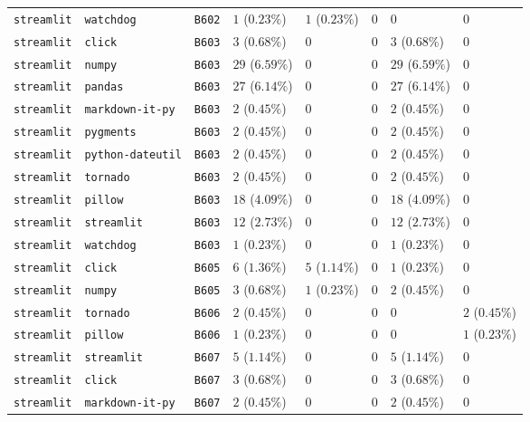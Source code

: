 \begin{table}
\begin{tabular}{llllllll}
\texttt{streamlit} & \texttt{watchdog} & \texttt{B602} & $1$ ($0.23\%$) & $1$ ($0.23\%$) & $0$ & $0$ & $0$ \\
\texttt{streamlit} & \texttt{click} & \texttt{B603} & $3$ ($0.68\%$) & $0$ & $0$ & $3$ ($0.68\%$) & $0$ \\
\texttt{streamlit} & \texttt{numpy} & \texttt{B603} & $29$ ($6.59\%$) & $0$ & $0$ & $29$ ($6.59\%$) & $0$ \\
\texttt{streamlit} & \texttt{pandas} & \texttt{B603} & $27$ ($6.14\%$) & $0$ & $0$ & $27$ ($6.14\%$) & $0$ \\
\texttt{streamlit} & \texttt{markdown-it-py} & \texttt{B603} & $2$ ($0.45\%$) & $0$ & $0$ & $2$ ($0.45\%$) & $0$ \\
\texttt{streamlit} & \texttt{pygments} & \texttt{B603} & $2$ ($0.45\%$) & $0$ & $0$ & $2$ ($0.45\%$) & $0$ \\
\texttt{streamlit} & \texttt{python-dateutil} & \texttt{B603} & $2$ ($0.45\%$) & $0$ & $0$ & $2$ ($0.45\%$) & $0$ \\
\texttt{streamlit} & \texttt{tornado} & \texttt{B603} & $2$ ($0.45\%$) & $0$ & $0$ & $2$ ($0.45\%$) & $0$ \\
\texttt{streamlit} & \texttt{pillow} & \texttt{B603} & $18$ ($4.09\%$) & $0$ & $0$ & $18$ ($4.09\%$) & $0$ \\
\texttt{streamlit} & \texttt{streamlit} & \texttt{B603} & $12$ ($2.73\%$) & $0$ & $0$ & $12$ ($2.73\%$) & $0$ \\
\texttt{streamlit} & \texttt{watchdog} & \texttt{B603} & $1$ ($0.23\%$) & $0$ & $0$ & $1$ ($0.23\%$) & $0$ \\
\texttt{streamlit} & \texttt{click} & \texttt{B605} & $6$ ($1.36\%$) & $5$ ($1.14\%$) & $0$ & $1$ ($0.23\%$) & $0$ \\
\texttt{streamlit} & \texttt{numpy} & \texttt{B605} & $3$ ($0.68\%$) & $1$ ($0.23\%$) & $0$ & $2$ ($0.45\%$) & $0$ \\
\texttt{streamlit} & \texttt{tornado} & \texttt{B606} & $2$ ($0.45\%$) & $0$ & $0$ & $0$ & $2$ ($0.45\%$) \\
\texttt{streamlit} & \texttt{pillow} & \texttt{B606} & $1$ ($0.23\%$) & $0$ & $0$ & $0$ & $1$ ($0.23\%$) \\
\texttt{streamlit} & \texttt{streamlit} & \texttt{B607} & $5$ ($1.14\%$) & $0$ & $0$ & $5$ ($1.14\%$) & $0$ \\
\texttt{streamlit} & \texttt{click} & \texttt{B607} & $3$ ($0.68\%$) & $0$ & $0$ & $3$ ($0.68\%$) & $0$ \\
\texttt{streamlit} & \texttt{markdown-it-py} & \texttt{B607} & $2$ ($0.45\%$) & $0$ & $0$ & $2$ ($0.45\%$) & $0$ \\

\end{tabular}
\end{table}
